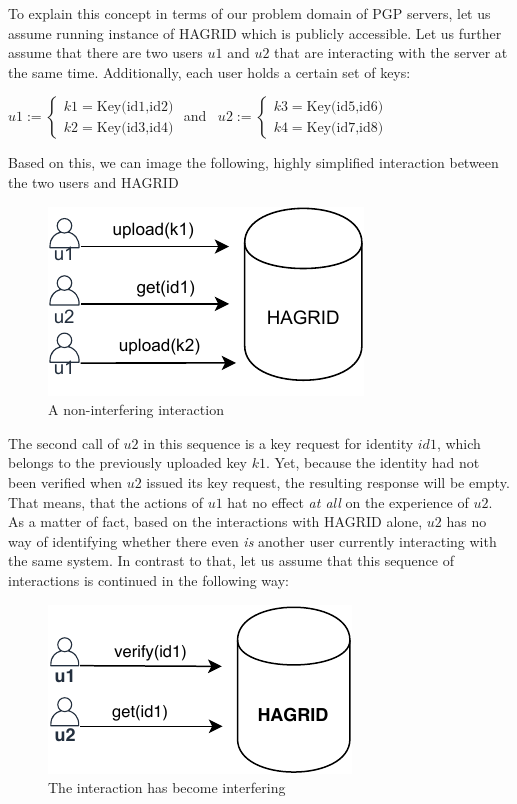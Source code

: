 To explain this concept in terms of our problem domain of PGP servers, let us assume running instance of HAGRID which is publicly accessible. Let us further assume that there are two users \(u1\) and \(u2\) that are interacting with the server at the same time. Additionally, each user holds a certain set of keys:


\(
    u1 := \begin{cases}
        k1 = \text{Key(id1,id2)} \\
        k2 = \text{Key(id3,id4)}
    \end{cases}
    \) and \, \(
    u2 := \begin{cases}
        k3 = \text{Key(id5,id6)} \\
        k4 = \text{Key(id7,id8)}
    \end{cases}
    \)

Based on this, we can image the following, highly simplified interaction between the two users and HAGRID
\begin{figure}[H]
    \label{fig:example}
    \centering
    \includegraphics{images/non_interference.pdf}
    \caption{A non-interfering interaction}
\end{figure}

The second call of \(u2\) in this sequence is a key request for identity \(id1\), which belongs to the previously uploaded key \(k1\). Yet, because the identity had not been verified when \(u2\) issued its key request, the resulting response will be empty. That means, that the actions of \(u1\) hat no effect \emph{at all} on the experience of \(u2\). 
As a matter of fact, based on the interactions with HAGRID alone, \(u2\) has no way of identifying whether there even \emph{is} another user currently interacting with the same system. 
In contrast to that, let us assume that this sequence of interactions is continued in the following way: 
\begin{figure}[H]
    \label{fig:example}
    \centering
    \includegraphics{images/interfering.pdf}
    \caption{The interaction has become interfering}
\end{figure}

